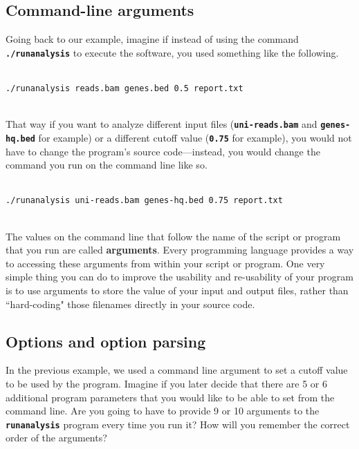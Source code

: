 \documentclass{article}
\begin{document}
\subsection{Command-line arguments}
Going back to our example, imagine if instead of using the command \texttt{\textbf{./runanalysis}} to execute the software, you used something like the following.
\\ \\
\begin{verbatim}
./runanalysis reads.bam genes.bed 0.5 report.txt
\end{verbatim}
\\
That way if you want to analyze different input files (\texttt{\textbf{uni-reads.bam}} and \texttt{\textbf{genes-hq.bed}} for example) or a different cutoff value (\texttt{\textbf{0.75}} for example), you would not have to change the program's source code---instead, you would change the command you run on the command line like so.
\\ \\
\begin{verbatim}
./runanalysis uni-reads.bam genes-hq.bed 0.75 report.txt
\end{verbatim}
\\
The values on the command line that follow the name of the script or program that you run are called \textbf{arguments}.
Every programming language provides a way to accessing these arguments from within your script or program.
One very simple thing you can do to improve the usability and re-usability of your program is to use arguments to store the value of your input and output files, rather than ``hard-coding" those filenames directly in your source code.

\subsection{Options and option parsing}
In the previous example, we used a command line argument to set a cutoff value to be used by the program. Imagine if you later decide that there are 5 or 6 additional program parameters that you would like to be able to set from the command line. Are you going to have to provide 9 or 10 arguments to the \texttt{\textbf{runanalysis}} program every time you run it? How will you remember the correct order of the arguments?
\end{document}
